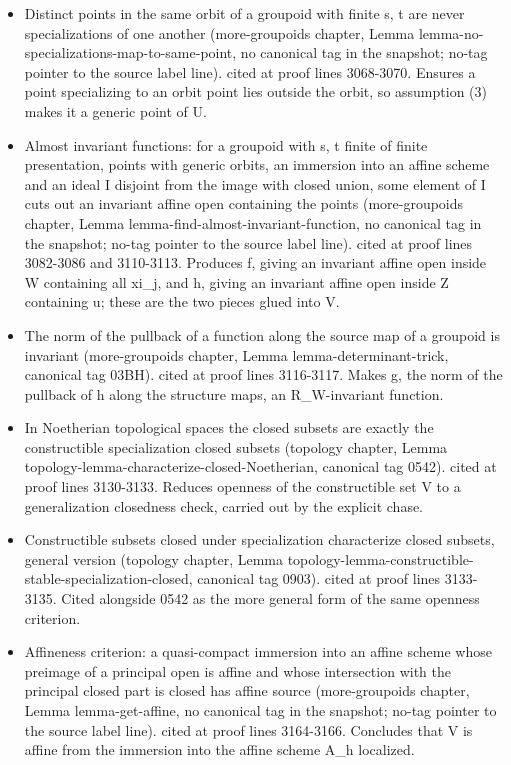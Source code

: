 \documentclass{stacks-project}
\theoremstyle{plain}
\theoremstyle{definition}
\theoremstyle{remark}
\numberwithin{equation}{subsection}
\begin{document}
\begin{itemize}
\item Distinct points in the same orbit of a groupoid with finite s, t are never specializations of one another (more-groupoids chapter, Lemma lemma-no-specializations-map-to-same-point, no canonical tag in the snapshot; no-tag pointer to the source label line). cited at proof lines 3068-3070. Ensures a point specializing to an orbit point lies outside the orbit, so assumption (3) makes it a generic point of U.
\item Almost invariant functions: for a groupoid with s, t finite of finite presentation, points with generic orbits, an immersion into an affine scheme and an ideal I disjoint from the image with closed union, some element of I cuts out an invariant affine open containing the points (more-groupoids chapter, Lemma lemma-find-almost-invariant-function, no canonical tag in the snapshot; no-tag pointer to the source label line). cited at proof lines 3082-3086 and 3110-3113. Produces f, giving an invariant affine open inside W containing all xi\_j, and h, giving an invariant affine open inside Z containing u; these are the two pieces glued into V.
\item The norm of the pullback of a function along the source map of a groupoid is invariant (more-groupoids chapter, Lemma lemma-determinant-trick, canonical tag 03BH). cited at proof lines 3116-3117. Makes g, the norm of the pullback of h along the structure maps, an R\_W-invariant function.
\item In Noetherian topological spaces the closed subsets are exactly the constructible specialization closed subsets (topology chapter, Lemma topology-lemma-characterize-closed-Noetherian, canonical tag 0542). cited at proof lines 3130-3133. Reduces openness of the constructible set V to a generalization closedness check, carried out by the explicit chase.
\item Constructible subsets closed under specialization characterize closed subsets, general version (topology chapter, Lemma topology-lemma-constructible-stable-specialization-closed, canonical tag 0903). cited at proof lines 3133-3135. Cited alongside 0542 as the more general form of the same openness criterion.
\item Affineness criterion: a quasi-compact immersion into an affine scheme whose preimage of a principal open is affine and whose intersection with the principal closed part is closed has affine source (more-groupoids chapter, Lemma lemma-get-affine, no canonical tag in the snapshot; no-tag pointer to the source label line). cited at proof lines 3164-3166. Concludes that V is affine from the immersion into the affine scheme A\_h localized.
\end{itemize}\medskip
\end{document}
